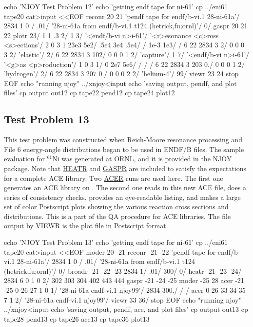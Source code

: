 \small
\begin{ccode}

echo 'NJOY Test Problem 12'
echo 'getting endf tape for ni-61'
cp ../eni61 tape20
cat>input <<EOF
 reconr
 20 21
 'pendf tape for endf/b-vi.1 28-ni-61a'/
 2834 1 0 /
 .01/
 '28-ni-61a from endf/b-vi.1 t124 (hetrick,fu;ornl)'/
 0/
 gaspr
 20 21 22
 plotr
 23/
 1 1 .3 2/
 1 3/
 '<endf/b-vi n>i-61'/
 '<r>esonance <c>ross <s>ections'/
 2 0 3 1 23e3 5e2/
 .5e4 3e4 .5e4/
 /
 1e-3 1e3/
 /
 6 22 2834 3 2/
 0 0 0 3 2/
 'elastic'/
 2/
 6 22 2834 3 102/
 0 0 0 1 2/
 'capture'/
 1 7/
 '<endf/b-vi n>i-61'/
 '<g>as <p>roduction'/
 1 0 3 1/
 0 2e7 5e6/
 /
 /
 /
 6 22 2834 3 203 0./
 0 0 0 1 2/
 'hydrogen'/
 2/
 6 22 2834 3 207 0./
 0 0 0 2 2/
 'helium-4'/
 99/
 viewr
 23 24
 stop
EOF
echo "running njoy"
../xnjoy<input
echo 'saving output, pendf, and plot files'
cp output out12
cp tape22 pend12
cp tape24 plot12

\end{ccode}
\normalsize

\subsection{Test Problem 13}
\label{ssMandT_13}

This test problem was constructed when Reich-Moore resonance
processing and File 6 energy-angle distributions began to be
used in ENDF/B files.  The sample evaluation for $^{61}$Ni was
generated at ORNL, and it is provided in the NJOY package.
Note that \hyperlink{sHEATRhy}{HEATR} and
\hyperlink{sGASPRhy}{GASPR} are included to satisfy the
expectations for a complete ACE library.  Two
\hyperlink{sACERhy}{ACER} runs are used here.  The first one
generates an ACE library on .  The second one reads
in this new ACE file, does a series of consistency checks, provides
an eye-readable listing, and makes a large set of color Postscript
plots showing the various reaction cross sections and
distributions.  This is a part of the QA procedure for ACE
libraries.  The file  output by
\hyperlink{sVIEWRhy}{VIEWR} is the plot file in Postscript
format.

\small
\begin{ccode}

echo 'NJOY Test Problem 13'
echo 'getting endf tape for ni-61'
cp ../eni61 tape20
cat>input <<EOF
 moder
 20 -21
 reconr
 -21 -22
 'pendf tape for endf/b-vi.1 28-ni-61a'/
 2834 1 0 /
 .01/
 '28-ni-61a from endf/b-vi.1 t124 (hetrick,fu;ornl)'/
 0/
 broadr
 -21 -22 -23
 2834 1/
 .01/
 300/
 0/
 heatr
 -21 -23 -24/
 2834 6 0 1 0 2/
 302 303 304 402 443 444
 gaspr
 -21 -24 -25
 moder
 -25 28
 acer
 -21 -25 0 26 27
 1 0 1/
 '28-ni-61a endf-vi.1 njoy99'/
 2834 300./
 /
 /
 acer
 0 26 33 34 35
 7 1 2/
 '28-ni-61a endf-vi.1 njoy99'/
 viewr
 33 36/
 stop
EOF
echo "running njoy"
../xnjoy<input
echo 'saving output, pendf, ace, and plot files'
cp output out13
cp tape28 pend13
cp tape26 ace13
cp tape36 plot13

\end{ccode}
\normalsize

